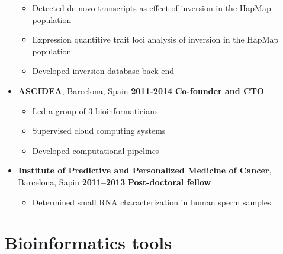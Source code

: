 \begin{itemize}
  \begin{itemize}
  \tightlist
  \item
    Detected de-novo transcripts as effect of inversion in the HapMap population
  \item
    Expression quantitive trait loci analysis of inversion in the HapMap population
  \item
    Developed inversion database back-end
  \end{itemize}
\item
  \textbf{ASCIDEA}, Barcelona, Spain \hfill \textbf{2011-2014}
  \newline
  \textbf{Co-founder and CTO}

  \begin{itemize}
  \tightlist
  \item
    Led a group of 3 bioinformaticians
  \item
    Supervised cloud computing systems
  \item
    Developed computational pipelines
  \end{itemize}
\item
  \textbf{Institute of Predictive and Personalized Medicine of Cancer}, Barcelona, Sapin \hfill \textbf{2011--2013}
  \newline
  \textbf{Post-doctoral fellow}

  \begin{itemize}
  \tightlist
  \item
    Determined small RNA characterization in human sperm samples
  \end{itemize}
\end{itemize}

\hypertarget{tools}{
\section{Bioinformatics tools}\label{tools}}

